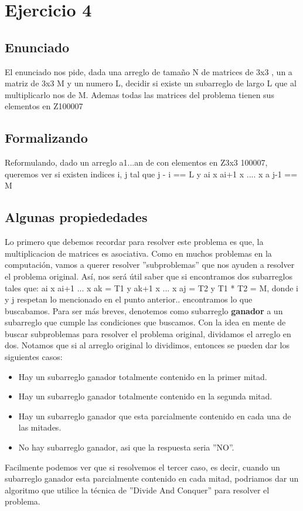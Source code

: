 \section{Ejercicio 4}

\subsection{Enunciado}
El enunciado nos pide, dada una arreglo de tamaño N de matrices de 3x3 , un a matriz de 3x3 M y un numero L, decidir
si existe un subarreglo de largo L que al multiplicarlo nos de M.
Ademas todas las matrices del problema tienen sus elementos en Z100007

\subsection{Formalizando}
Reformulando, dado un arreglo a1...an de con elementos en Z3x3 100007, queremos ver si existen indices
i, j tal que j - i == L y ai x ai+1 x .... x a j-1 == M

\subsection{Algunas propiededades}
Lo primero que debemos recordar para resolver este problema es que, la multiplicacion de matrices es asociativa.
Como en muchos problemas en la computación, vamos a querer resolver ''subproblemas'' 
que nos ayuden a resolver el problema original. Así, nos será útil saber que si encontramos dos subarreglos tales que:
ai x ai+1 ... x ak = T1 y ak+1 x ... x aj = T2 y T1 * T2 = M, donde i y j 
respetan lo mencionado en el punto anterior..
encontramos lo que buscabamos.
\newline
Para ser más breves, denotemos como subarreglo \textbf{ganador} a un subarreglo que cumple las condiciones que buscamos.
Con la idea en mente de buscar subproblemas para resolver el problema original, dividamos el arreglo en dos.
Notamos que si al arreglo original lo dividimos, entonces se pueden dar los siguientes casos:
\begin{itemize}
\item Hay un subarreglo ganador totalmente contenido en la primer mitad.
\item Hay un subarreglo ganador totalmente contenido en la segunda mitad.
\item Hay un subarreglo ganador que esta parcialmente contenido en cada una de las mitades.
\item No hay subarreglo ganador, asi que la respuesta seria ''NO''.
\end{itemize}
Facilmente podemos ver que si resolvemos el tercer caso, es decir, cuando un subarreglo 
ganador esta parcialmente contenido en cada mitad, podriamos dar un algoritmo 
que utilice la técnica de ''Divide And Conquer'' para resolver el problema. 
